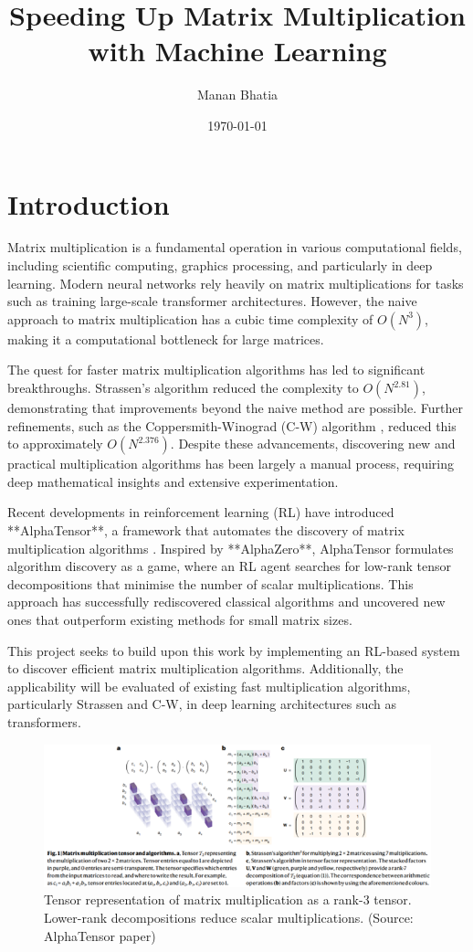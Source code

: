\documentclass{article}
\title{Speeding Up Matrix Multiplication with Machine Learning}
\author{Manan Bhatia}
\date{\today}
\begin{document}
\maketitle

\section{Introduction}
Matrix multiplication is a fundamental operation in various computational fields, including scientific computing, graphics processing, and particularly in deep learning. Modern neural networks rely heavily on matrix multiplications for tasks such as training large-scale transformer architectures. However, the naive approach to matrix multiplication has a cubic time complexity of \( O(N^3) \), making it a computational bottleneck for large matrices.  

The quest for faster matrix multiplication algorithms has led to significant breakthroughs. Strassen's algorithm \cite{strassen1969gaussian} reduced the complexity to \( O(N^{2.81}) \), demonstrating that improvements beyond the naive method are possible. Further refinements, such as the Coppersmith-Winograd (C-W) algorithm \cite{coppersmith1990matrix}, reduced this to approximately \( O(N^{2.376}) \). Despite these advancements, discovering new and practical multiplication algorithms has been largely a manual process, requiring deep mathematical insights and extensive experimentation.  

Recent developments in reinforcement learning (RL) have introduced **AlphaTensor**, a framework that automates the discovery of matrix multiplication algorithms \cite{fawzi2022discovering}. Inspired by **AlphaZero**, AlphaTensor formulates algorithm discovery as a game, where an RL agent searches for low-rank tensor decompositions that minimise the number of scalar multiplications. This approach has successfully rediscovered classical algorithms and uncovered new ones that outperform existing methods for small matrix sizes.  

This project seeks to build upon this work by implementing an RL-based system to discover efficient matrix multiplication algorithms. Additionally, the applicability will be evaluated of existing fast multiplication algorithms, particularly Strassen and C-W, in deep learning architectures such as transformers.
\begin{figure}[H]
    \centering
    \includegraphics[width=0.6\linewidth]{Picture1.png}
    \caption{Tensor representation of matrix multiplication as a rank-3 tensor. Lower-rank decompositions reduce scalar multiplications. (Source: AlphaTensor paper)}
    \label{fig:tensor-representation}
\end{figure}
\end{document}
